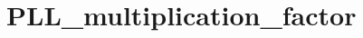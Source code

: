 \hypertarget{group___p_l_l__multiplication__factor}{\section{P\-L\-L\-\_\-multiplication\-\_\-factor}
\label{group___p_l_l__multiplication__factor}
}
